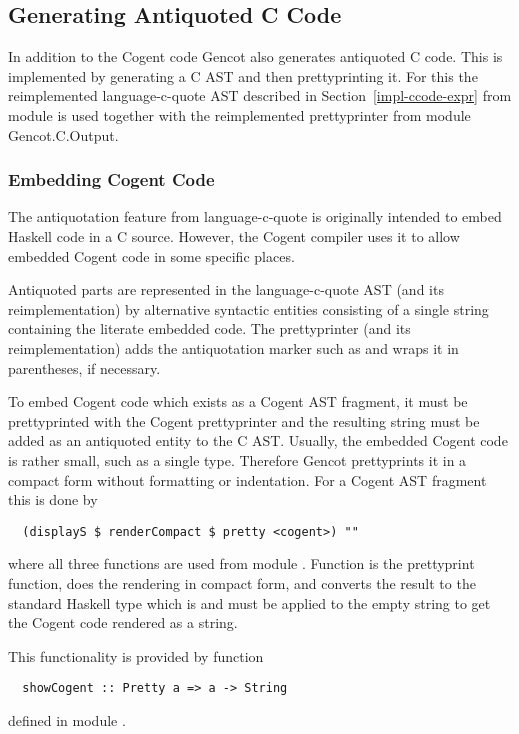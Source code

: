 \subsection{Generating Antiquoted C Code}
\label{impl-ccode-anti}

In addition to the Cogent code Gencot also generates antiquoted C code. This is implemented by generating 
a C AST and then prettyprinting it. For this the reimplemented language-c-quote AST described in 
Section~\ref{impl-ccode-expr} from module  is used together with the reimplemented 
prettyprinter from module Gencot.C.Output.

\subsubsection{Embedding Cogent Code}

The antiquotation feature from language-c-quote is originally intended to embed Haskell code in a C source.
However, the Cogent compiler uses it to allow embedded Cogent code in some specific places.

Antiquoted parts are represented in the language-c-quote AST (and its reimplementation) by alternative syntactic
entities consisting of a single string containing the literate embedded code. The prettyprinter (and its 
reimplementation) adds the antiquotation marker such as  and wraps it in parentheses, if necessary.

To embed Cogent code which exists as a Cogent AST fragment, it must be prettyprinted with the Cogent prettyprinter
and the resulting string must be added as an antiquoted entity to the C AST. Usually, the embedded Cogent code 
is rather small, such as a single type. Therefore Gencot prettyprints it in a compact form without formatting or
indentation. For a Cogent AST fragment  this is done by
\begin{verbatim}
  (displayS $ renderCompact $ pretty <cogent>) ""
\end{verbatim}
where all three functions are used from module . Function  is 
the prettyprint function,  does the rendering in compact form, and  converts
the result to the standard Haskell type  which is  and must be applied to
the empty string to get the Cogent code rendered as a string.

This functionality is provided by function 
\begin{verbatim}
  showCogent :: Pretty a => a -> String
\end{verbatim}
defined in module .

